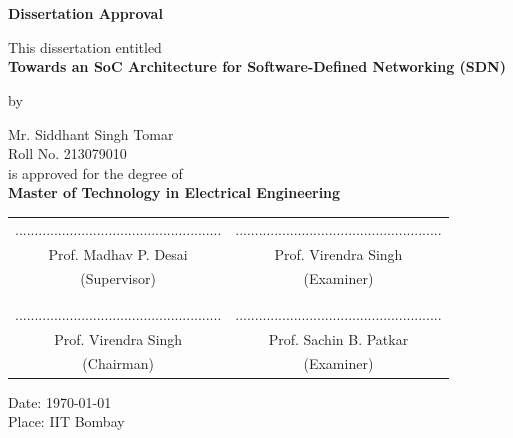 \documentclass[12pt]{report}
\begin{document}
\newpage
{}


\chapter*{}
\begin{center}
{\Large \textbf{Dissertation Approval}}

\bigskip
\bigskip
\bigskip
This dissertation entitled\\
\bigskip
\textbf{Towards an SoC Architecture for Software-Defined Networking (SDN)}\\
\bigskip

by\\
\bigskip

Mr. Siddhant Singh Tomar\\
Roll No. 213079010\\
\bigskip
is   approved for the degree of\\
\textbf{Master of Technology in Electrical Engineering}\\

\end{center}
 \vspace{10mm}
\begingroup
\setlength{\tabcolsep}{30pt}
\begin{center}
    \begin{tabular}{c c}
        ..................................................... & .....................................................\\
        Prof. Madhav P. Desai & Prof. Virendra Singh\\
        (Supervisor)     & (Examiner)\\
        \\\\
        ..................................................... & .....................................................\\
        Prof. Virendra Singh   & Prof. Sachin B. Patkar\\
        (Chairman) & (Examiner)\\
    \end{tabular}
\end{center}
\endgroup
\bigskip
{Date: \today}\\
{Place: IIT Bombay}


\newpage
\end{document}
